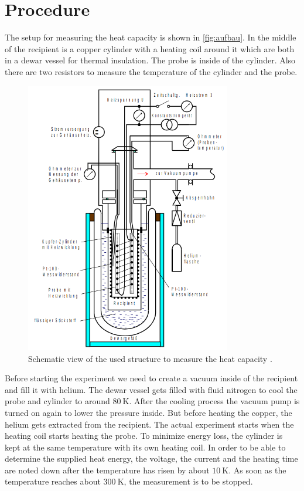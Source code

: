 \section{Procedure}
\label{sec:Durchführung}



The setup for measuring the heat capacity is shown in \autoref{fig:aufbau}.
In the middle of the recipient is a copper cylinder with a heating coil around it which are both in a dewar vessel for thermal insulation.
The probe is inside of the cylinder.
Also there are two resistors to measure the temperature of the cylinder and the probe.
\begin{figure}
    \centering
    \includegraphics[width=0.8\textwidth]{content/plots/aufbau.png}
    \caption{Schematic view of the used structure to measure the heat capacity \cite{V47}.}
    \label{fig:aufbau}
\end{figure}
Before starting the experiment we need to create a vacuum inside of the recipient and fill it with helium.
The dewar vessel gets filled with fluid nitrogen to cool the probe and cylinder to around $\qty{80}{\kelvin}$.
After the cooling process the vacuum pump is turned on again to lower the pressure inside.
But before heating the copper, the helium gets extracted from the recipient.
The actual experiment starts when the heating coil starts heating the probe.
To minimize energy loss, the cylinder is kept at the same temperature with its own heating coil.
In order to be able to determine the supplied heat energy, the voltage, the current and the heating time are noted down after the temperature has risen by about $\qty{10}{\kelvin}$.
As soon as the temperature reaches about $\qty{300}{\kelvin}$, the measurement is to be stopped.
